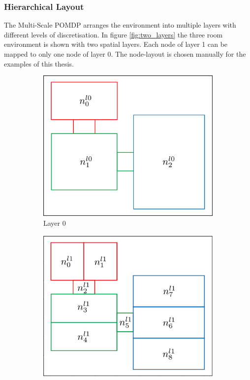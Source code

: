 \subsubsection{Hierarchical Layout}
The Multi-Scale POMDP arranges the environment into multiple layers with different levels of discretisation. In figure \ref{fig:two_layers} the three room environment is shown with two spatial layers. Each node of layer 1 can be mapped to only one node of layer 0. The node-layout is chosen manually for the examples of this thesis. 
\begin{figure}
    \centering
    \begin{subfigure}[b]{0.48\textwidth}
        \includegraphics[width=\textwidth]{Report/images/layer0_b.png}
        \caption[t]{Layer 0}
        \label{subfig:l0}
    \end{subfigure}
    \hfill
    \begin{subfigure}[b]{0.48\textwidth}
        \includegraphics[width=\textwidth]{Report/images/layer1.png}

\end{subfigure}
\end{figure}
